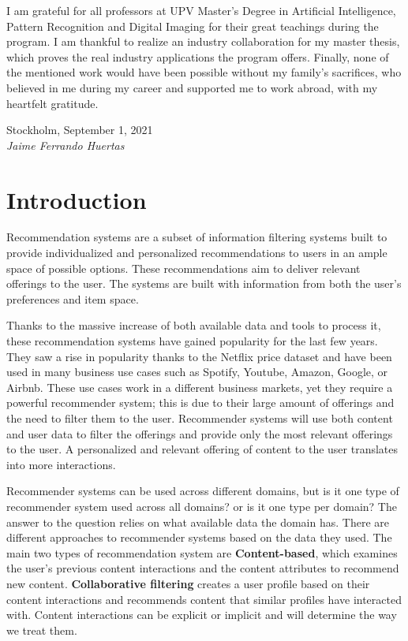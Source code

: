 \documentclass{kththesis}
\begin{document}
I am grateful for all professors at UPV Master's Degree in Artificial Intelligence, Pattern Recognition and Digital Imaging for their great teachings during the program. I am thankful to realize an industry collaboration for my master thesis, which proves the real industry applications the program offers. Finally, none of the mentioned work would have been possible without my family's sacrifices, who believed in me during my career and supported me to work abroad, with my heartfelt gratitude.
\newline
\newline
\newline
\newline
\newline

\noindent Stockholm, September 1, 2021 \\
\noindent \textit{Jaime Ferrando Huertas}

\chapter{Introduction}

Recommendation systems are a subset of information filtering systems built to provide individualized and personalized recommendations to users in an ample space of possible options. These recommendations aim to deliver relevant offerings to the user. The systems are built with information from both the user's preferences and item space.

Thanks to the massive increase of both available data and tools to process it, these recommendation systems have gained popularity for the last few years. They saw a rise in popularity thanks to the Netflix price dataset \cite{netflix} and have been used in many business use cases such as Spotify, Youtube, Amazon, Google, or Airbnb. These use cases work in a different business markets, yet they require a powerful recommender system; this is due to their large amount of offerings and the need to filter them to the user. Recommender systems will use both content and user data to filter the offerings and provide only the most relevant offerings to the user. A personalized and relevant offering of content to the user translates into more interactions.

Recommender systems can be used across different domains, but is it one type of recommender system used across all domains? or is it one type per domain? The answer to the question relies on what available data the domain has. There are different approaches to recommender systems based on the data they used. The main two types of recommendation system are \textbf{Content-based}, which examines the user's previous content interactions and the content attributes to recommend new content. \textbf{Collaborative filtering} creates a user profile based on their content interactions and recommends content that similar profiles have interacted with. Content interactions can be explicit or implicit and will determine the way we treat them.
\end{document}
